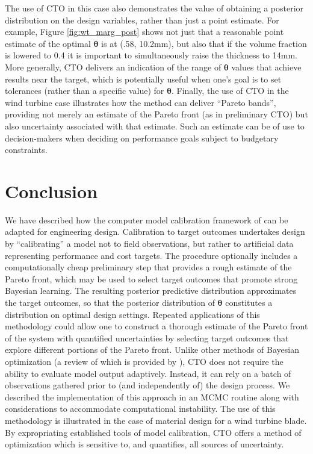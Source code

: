 \documentclass[12pt]{article}
\begin{document}
%
The use of CTO in this case also demonstrates the value of obtaining a posterior distribution on the design variables, rather than just a point estimate.
%
For example, Figure \ref{fig:wt_marg_post} shows not just that a reasonable point estimate of the optimal $\boldsymbol\theta$ is at (.58, 10.2mm), but also that if the volume fraction is lowered to 0.4 it is important to simultaneously raise the thickness to 14mm.
%
More generally, CTO delivers an indication of the range of $\boldsymbol\theta$ values that achieve results near the target, which is potentially useful when one's goal is to set tolerances (rather than a specific value) for $\boldsymbol\theta$.
%
Finally, the use of CTO in the wind turbine case illustrates how the method can deliver ``Pareto bands'', providing not merely an estimate of the Pareto front (as in preliminary CTO) but also uncertainty associated with that estimate.
%
Such an estimate can be of use to decision-makers when deciding on performance goals subject to budgetary constraints.



\section{Conclusion} \label{conclusion}

We have described how the 
computer model calibration framework of  \cite{Kennedy2001} can be adapted for engineering design. 
%
Calibration to target outcomes undertakes design by ``calibrating'' a model not to field observations, but rather to artificial data representing performance and cost targets. 
%
The procedure optionally includes a computationally cheap preliminary step that provides a rough estimate of the Pareto front, which may be used to select target outcomes that promote strong Bayesian learning.
%
The resulting posterior predictive distribution approximates the target outcomes, so that the posterior distribution of $\boldsymbol\theta$ constitutes a distribution on optimal design settings.
%
Repeated applications of this methodology could allow one to construct a thorough estimate of the Pareto front of the system with quantified uncertainties by selecting target outcomes that explore different portions of the Pareto front.
%
Unlike other methods of Bayesian optimization (a review of which is provided by \citealt{Shahriari2016}), CTO does not require the ability to evaluate model output adaptively.
%
Instead, it can rely on a batch of observations gathered prior to (and independently of) the design process.
%
We described the implementation of this approach in an MCMC routine along with considerations to accommodate computational instability.
%
The use of this methodology is illustrated in the case of material design for a wind turbine blade. 
%
%
By expropriating established tools of model calibration, CTO offers a method of optimization which is sensitive to, and quantifies, all sources of uncertainty.
%
\end{document}
